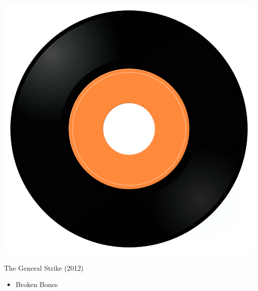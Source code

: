 \begin{minipage}[t]{0.25\textwidth}\vspace{0pt}
\captionsetup{type=figure}
\includegraphics[width=\textwidth]{Images/cover.png}
\caption*{The General Strike (2012)}
\end{minipage}
\begin{minipage}[t]{0.25\textwidth}\vspace{0pt}
\begin{itemize}[nosep,leftmargin=1em,labelwidth=*,align=left]
	\setlength{\itemsep}{0pt}
	\item Broken Bones
\end{itemize}
\end{minipage}
